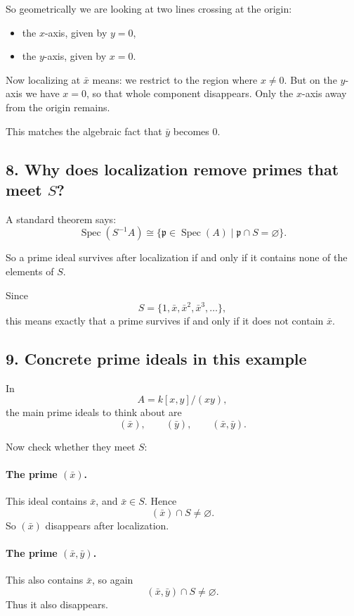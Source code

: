 \documentclass[12pt,a4paper]{article}
\theoremstyle{notespace}
\DeclareMathOperator{\Spec}{Spec}
\begin{document}
So geometrically we are looking at two lines crossing at the origin:
\begin{itemize}
	\item the \(x\)-axis, given by \(y=0\),
	\item the \(y\)-axis, given by \(x=0\).
\end{itemize}

Now localizing at \(\bar x\) means: we restrict to the region where \(x\neq 0\). But on the \(y\)-axis we have \(x=0\), so that whole component disappears. Only the \(x\)-axis away from the origin remains.

This matches the algebraic fact that \(\bar y\) becomes \(0\).

\subsection{8. Why does localization remove primes that meet \(S\)?}

A standard theorem says:
\[
\Spec(S^{-1}A)\cong
\{\mathfrak p\in\Spec(A)\mid \mathfrak p\cap S=\varnothing\}.
\]

So a prime ideal survives after localization if and only if it contains none of the elements of \(S\).

Since
\[
S=\{1,\bar x,\bar x^2,\bar x^3,\dots\},
\]
this means exactly that a prime survives if and only if it does not contain \(\bar x\).

\subsection{9. Concrete prime ideals in this example}

In
\[
A=k[x,y]/(xy),
\]
the main prime ideals to think about are
\[
(\bar x), \qquad (\bar y), \qquad (\bar x,\bar y).
\]

Now check whether they meet \(S\):

\paragraph{The prime \((\bar x)\).}
This ideal contains \(\bar x\), and \(\bar x\in S\). Hence
\[
(\bar x)\cap S\neq\varnothing.
\]
So \((\bar x)\) disappears after localization.

\paragraph{The prime \((\bar x,\bar y)\).}
This also contains \(\bar x\), so again
\[
(\bar x,\bar y)\cap S\neq\varnothing.
\]
Thus it also disappears.
\end{document}
